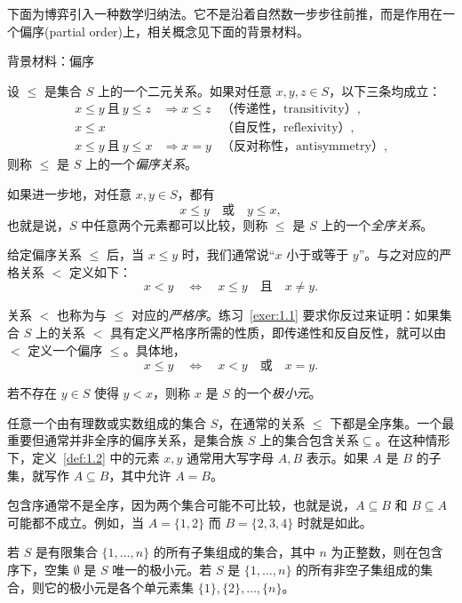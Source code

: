 下面为博弈引入一种数学归纳法。它不是沿着自然数一步步往前推，而是作用在一个偏序(partial order)上，相关概念见下面的背景材料。
\begin{mybox}{背景材料：偏序}

\begin{definition}[偏序、全序]\label{def:1.2}
设 \(\leq\) 是集合 \(S\) 上的一个二元关系。如果对任意 \(x,y,z\in S\)，以下三条均成立：
\[
\begin{array}{lll}
x\leq y\ \text{且}\ y\leq z
&\Rightarrow x\leq z
&\text{（传递性，transitivity）},\\
x\leq x
&&\text{（自反性，reflexivity）},\\
x\leq y\ \text{且}\ y\leq x
&\Rightarrow x=y
&\text{（反对称性，antisymmetry）},
\end{array}
\]
则称 \(\leq\) 是 \(S\) 上的一个\emph{偏序关系}。

如果进一步地，对任意 \(x,y\in S\)，都有
\[
x\leq y\quad\text{或}\quad y\leq x,
\]
也就是说，\(S\) 中任意两个元素都可以比较，则称 \(\leq\) 是 \(S\) 上的一个\emph{全序关系}。
\end{definition}

给定偏序关系 \(\leq\) 后，当 \(x\leq y\) 时，我们通常说“\(x\) 小于或等于 \(y\)”。与之对应的严格关系 \(<\) 定义如下：
\begin{equation}\label{eq:1.6}
x<y
\quad\Leftrightarrow\quad
x\leq y\quad\text{且}\quad x\neq y.
\end{equation}

关系 \(<\) 也称为与 \(\leq\) 对应的\emph{严格序}。练习~\ref{exer:1.1} 要求你反过来证明：如果集合 \(S\) 上的关系 \(<\) 具有定义严格序所需的性质，即传递性和反自反性，就可以由 \(<\) 定义一个偏序 \(\leq\)。具体地，
\begin{equation}\label{eq:1.7}
x\leq y
\quad\Leftrightarrow\quad
x<y\quad\text{或}\quad x=y.
\end{equation}

若不存在 \(y\in S\) 使得 \(y<x\)，则称 \(x\) 是 \(S\) 的一个\emph{极小元}。

任意一个由有理数或实数组成的集合 \(S\)，在通常的关系 \(\leq\) 下都是全序集。一个最重要但通常并非全序的偏序关系，是集合族 \(S\) 上的集合包含关系\(\subseteq\)。在这种情形下，定义~\ref{def:1.2} 中的元素 \(x,y\) 通常用大写字母 \(A,B\) 表示。如果 \(A\) 是 \(B\) 的子集，就写作 \(A\subseteq B\)，其中允许 \(A=B\)。

包含序通常不是全序，因为两个集合可能不可比较，也就是说，\(A\subseteq B\) 和 \(B\subseteq A\) 可能都不成立。例如，当 \(A=\{1,2\}\) 而 \(B=\{2,3,4\}\) 时就是如此。

若 \(S\) 是有限集合 \(\{1,\ldots,n\}\) 的所有子集组成的集合，其中 \(n\) 为正整数，则在包含序下，空集 \(\emptyset\) 是 \(S\) 唯一的极小元。若 \(S\) 是 \(\{1,\ldots,n\}\) 的所有非空子集组成的集合，则它的极小元是各个单元素集 \(\{1\},\{2\},\ldots,\{n\}\)。

\end{mybox}

